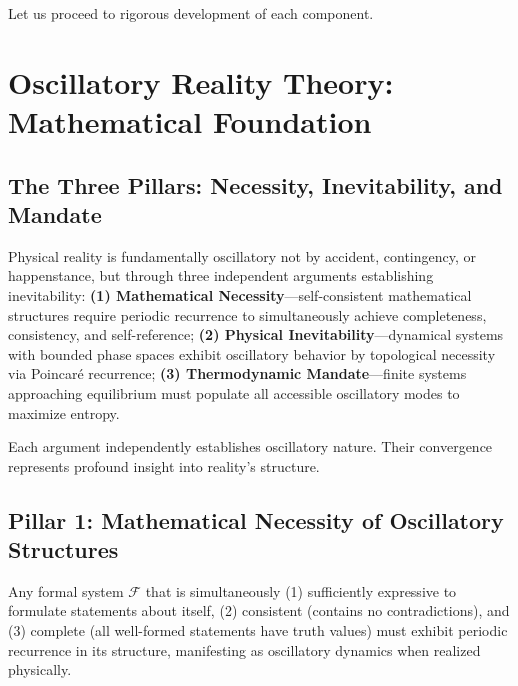 \documentclass[11pt,onecolumn]{article}
\begin{document}
Let us proceed to rigorous development of each component.

\clearpage

\section{Oscillatory Reality Theory: Mathematical Foundation}

\subsection{The Three Pillars: Necessity, Inevitability, and Mandate}

Physical reality is fundamentally oscillatory not by accident, contingency, or happenstance, but through three independent arguments establishing inevitability: \textbf{(1) Mathematical Necessity}---self-consistent mathematical structures require periodic recurrence to simultaneously achieve completeness, consistency, and self-reference; \textbf{(2) Physical Inevitability}---dynamical systems with bounded phase spaces exhibit oscillatory behavior by topological necessity via Poincar\'e recurrence; \textbf{(3) Thermodynamic Mandate}---finite systems approaching equilibrium must populate all accessible oscillatory modes to maximize entropy.

Each argument independently establishes oscillatory nature. Their convergence represents profound insight into reality's structure.

\subsection{Pillar 1: Mathematical Necessity of Oscillatory Structures}

\begin{theorem}
\label{thm:math_necessity}
Any formal system $\mathcal{F}$ that is simultaneously \textup{(1)} sufficiently expressive to formulate statements about itself, \textup{(2)} consistent (contains no contradictions), and \textup{(3)} complete (all well-formed statements have truth values) must exhibit periodic recurrence in its structure, manifesting as oscillatory dynamics when realized physically.
\end{theorem}
\end{document}
